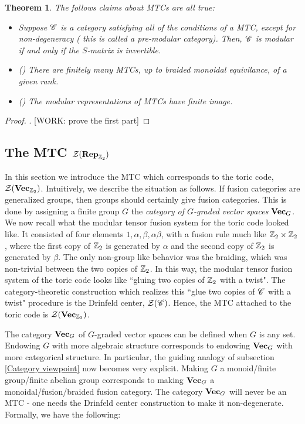 \documentclass{article}
\newtheorem{theorem}{Theorem}[section]
\theoremstyle{definition}
\numberwithin{figure}{section}
\begin{document}
\begin{theorem} The follows claims about MTCs are all true:

\begin{itemize}
\item Suppose $\mathscr{C}$ is a category satisfying all of the conditions of a MTC, except for non-degeneracy ( this is called a pre-modular category). Then, $\mathscr{C}$ is modular if and only if the $S$-matrix is invertible.
\item (\cite{bruillard2016rank}) There are finitely many MTCs, up to braided monoidal equivilance, of a given rank.
\item (\cite{ng2010congruence}) The modular representations of MTCs have finite image.
\end{itemize}
\end{theorem}
\begin{proof}. [WORK: prove the first part]
\end{proof}

\subsection{The MTC $\mathcal{Z}(\bold{Rep}_{\mathbb{Z}_2})$}
\label{VecZ2 MTC}

In this section we introduce the MTC which corresponds to the toric code, $\mathcal{Z}(\bold{Vec}_{\mathbb{Z}_2})$. Intuitively, we describe the situation as follows. If fusion categories are generalized groups, then groups should certainly give fusion categories. This is done by assigning a finite group $G$ the \textit{category of $G$-graded vector spaces} $\bold{Vec}_G$. We now recall what the modular tensor fusion system for the toric code looked like. It consisted of four elements $1,\alpha,\beta,\alpha\beta$, with a fusion rule much like $\mathbb{Z}_2\times \mathbb{Z}_2$, where the first copy of $\mathbb{Z}_2$ is generated by $\alpha$ and the second copy of $\mathbb{Z}_2$ is generated by $\beta$. The only non-group like behavior was the braiding, which was non-trivial between the two copies of $\mathbb{Z}_2$. In this way, the modular tensor fusion system of the toric code looks like ``gluing two copies of $\mathbb{Z}_2$ with a twist". The category-theoretic construction which realizes this ``glue two copies of $\mathscr{C}$ with a twist" procedure is the Drinfeld center, $\mathcal{Z}(\mathscr{C})$. Hence, the MTC attached to the toric code is $\mathcal{Z}(\bold{Vec}_{\mathbb{Z}_2})$.

The category $\bold{Vec}_G$ of $G$-graded vector spaces can be defined when $G$ is any set. Endowing $G$ with more algebraic structure corresponds to endowing $\bold{Vec}_G$ with more categorical structure. In particular, the guiding analogy of subsection \ref{Category viewpoint} now becomes very explicit. Making $G$ a monoid/finite group/finite abelian group corresponds to making $\bold{Vec}_G$ a monoidal/fusion/braided fusion category. The category $\bold{Vec}_G$ will never be an MTC - one needs the Drinfeld center construction to make it non-degenerate. Formally, we have the following:
\end{document}
